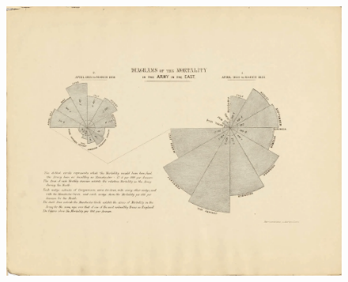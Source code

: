 \documentclass[
  letterpaper,
  chapter,a4paper,showtrims,openright,hidelinks]{oblivoir}
\begin{document}
\begin{figure}
\begin{minipage}[t]{0.20\linewidth}
{{\includegraphics{images/nightingale_graph_03.png}

}

}

\end{minipage}%
%
\begin{minipage}[t]{0.20\linewidth}

{\centering 

}
\end{minipage}
\end{figure}
\end{document}
